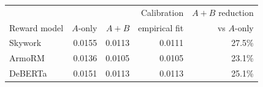 \begin{tabular}{lrrrr}
\toprule
 &  &  & Calibration & $A{+}B$ reduction \\
Reward model & $A$-only & $A{+}B$ & empirical fit & vs $A$-only \\
\midrule
Skywork & 0.0155 & 0.0113 & 0.0111 & 27.5\% \\
ArmoRM & 0.0136 & 0.0105 & 0.0105 & 23.1\% \\
DeBERTa & 0.0151 & 0.0113 & 0.0113 & 25.1\% \\
\bottomrule
\end{tabular}
